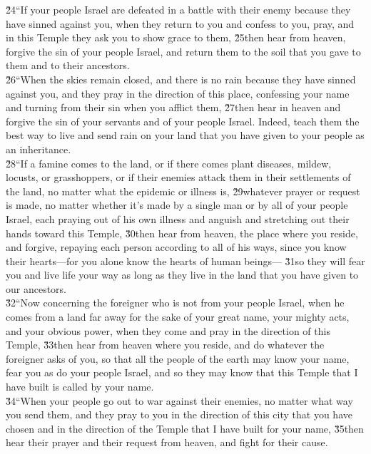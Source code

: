 \begin{poetry}
\poeml \v{24}``If your people Israel are defeated in a battle with their enemy because they have sinned against you, when they return to you and confess to you, pray, and in this Temple they ask you to show grace to them, \v{25}then hear from heaven, forgive the sin of your people Israel, and return them to the soil that you gave to them and to their ancestors. \\
\poeml \v{26}``When the skies remain closed, and there is no rain because they have sinned against you, and they pray in the direction of this place, confessing your name and turning from their sin when you afflict them, \v{27}then hear in heaven and forgive the sin of your servants and of your people Israel. Indeed, teach them the best way to live and send rain on your land that you have given to your people as an inheritance. \\
\poeml \v{28}``If a famine comes to the land, or if there comes plant diseases, mildew, locusts, or grasshoppers, or if their enemies attack them in their settlements of the land, no matter what the epidemic or illness is, \v{29}whatever prayer or request is made, no matter whether it's made by a single man or by all of your people Israel, each praying out of his own illness and anguish and stretching out their hands toward this Temple, \v{30}then hear from heaven, the place where you reside, and forgive, repaying each person according to all of his ways, since you know their hearts---for you alone know the hearts of human beings--- \v{31}so they will fear you and live life your way as long as they live in the land that you have given to our ancestors. \\
\poeml \v{32}``Now concerning the foreigner who is not from your people Israel, when he comes from a land far away for the sake of your great name, your mighty acts, and your obvious power, when they come and pray in the direction of this Temple, \v{33}then hear from heaven where you reside, and do whatever the foreigner asks of you, so that all the people of the earth may know your name, fear you as do your people Israel, and so they may know that this Temple that I have built is called by your name. \\
\poeml \v{34}``When your people go out to war against their enemies, no matter what way you send them, and they pray to you in the direction of this city that you have chosen and in the direction of the Temple that I have built for your name, \v{35}then hear their prayer and their request from heaven, and fight for their cause. \\

\end{poetry}
